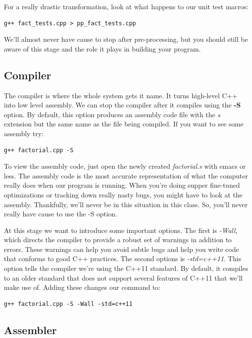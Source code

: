 \documentclass[]{tufte-handout}
\begin{document}
For a really drastic transformation, look at what happens to our unit test macros:
\begin{verbatim}
g++ fact_tests.cpp > pp_fact_tests.cpp
\end{verbatim}

We'll almost never have cause to stop after pre-processing, but you should still be aware of this stage and the role it plays in building your program. 

\subsection{Compiler}

The compiler is where the whole system gets it name.  It turns high-level C++ into low level assembly.  We can stop the compiler after it compiles using the \textbf{-S} option. By default, this option produces an assembly code file with the \textit{s} extension but the same name as the file being compiled. If you want to see some assembly try:
\begin{verbatim}
g++ factorial.cpp -S
\end{verbatim}
To view the assembly code, just open the newly created \textit{factorial.s} with emacs or less. The assembly code is the most accurate representation of what the computer really does when our program is running.  When you're doing supper fine-tuned optimizations or tracking down really nasty bugs, you might have to look at the assembly.  Thankfully, we'll never be in this situation in this class. So, you'll never really have cause to use the -S option.  

At this stage we want to introduce some important options. The first is \textit{-Wall}, which directs the compiler to provide a robust set of warnings in addition to errors. These warnings can help you avoid subtle bugs and help you write code that conforms to good C++ practices. The second options is \textit{-std=c++11}. This option tells the compiler we're using the C++11 standard. By default, it compiles to an older standard that does not support several features of C++11 that we'll make use of.  Adding these changes our command to:
\begin{verbatim}
g++ factorial.cpp -S -Wall -std=c++11
\end{verbatim}

\subsection{Assembler}
\end{document}
